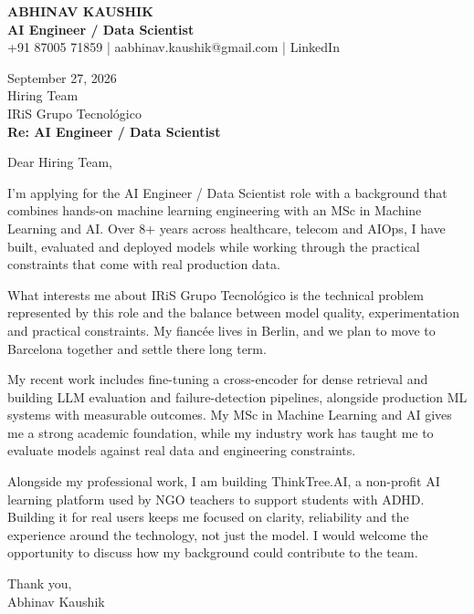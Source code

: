 \documentclass[10pt,a4paper]{article}
\begin{document}
\begin{center}
{\Large\bfseries ABHINAV KAUSHIK}\\[2pt]
{\bfseries AI Engineer / Data Scientist}\\[2pt]
+91 87005 71859 \quad | \quad aabhinav.kaushik@gmail.com \quad | \quad LinkedIn
\end{center}
\vspace{8pt}
September 27, 2026\\[6pt]
Hiring Team\\
IRiS Grupo Tecnológico\\[4pt]
\textbf{Re: AI Engineer / Data Scientist}

Dear Hiring Team,

I’m applying for the AI Engineer / Data Scientist role with a background that combines hands-on machine learning engineering with an MSc in Machine Learning and AI. Over 8+ years across healthcare, telecom and AIOps, I have built, evaluated and deployed models while working through the practical constraints that come with real production data.

What interests me about IRiS Grupo Tecnológico is the technical problem represented by this role and the balance between model quality, experimentation and practical constraints. My fiancée lives in Berlin, and we plan to move to Barcelona together and settle there long term.

My recent work includes fine-tuning a cross-encoder for dense retrieval and building LLM evaluation and failure-detection pipelines, alongside production ML systems with measurable outcomes. My MSc in Machine Learning and AI gives me a strong academic foundation, while my industry work has taught me to evaluate models against real data and engineering constraints.

Alongside my professional work, I am building ThinkTree.AI, a non-profit AI learning platform used by NGO teachers to support students with ADHD. Building it for real users keeps me focused on clarity, reliability and the experience around the technology, not just the model. I would welcome the opportunity to discuss how my background could contribute to the team.

Thank you,\\
Abhinav Kaushik
\end{document}
